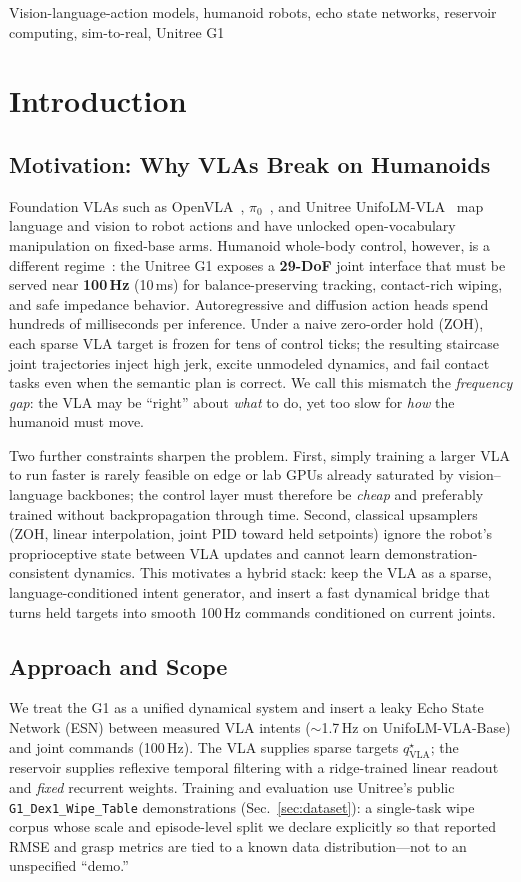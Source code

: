 \documentclass[conference]{IEEEtran}
\begin{document}
\begin{IEEEkeywords}
Vision-language-action models, humanoid robots, echo state networks, reservoir computing, sim-to-real, Unitree G1
\end{IEEEkeywords}

\section{Introduction}
\subsection{Motivation: Why VLAs Break on Humanoids}
Foundation VLAs such as OpenVLA~\cite{OpenVLA2025}, $\pi_0$~\cite{Preprints2026}, and Unitree UnifoLM-VLA~\cite{UnifoLM2026} map language and vision to robot actions and have unlocked open-vocabulary manipulation on fixed-base arms.
Humanoid whole-body control, however, is a different regime~\cite{PhysicalAI2026}: the Unitree G1 exposes a \textbf{29-DoF} joint interface that must be served near \textbf{100\,Hz} (10\,ms) for balance-preserving tracking, contact-rich wiping, and safe impedance behavior.
Autoregressive and diffusion action heads spend hundreds of milliseconds per inference.
Under a naive zero-order hold (ZOH), each sparse VLA target is frozen for tens of control ticks; the resulting staircase joint trajectories inject high jerk, excite unmodeled dynamics, and fail contact tasks even when the semantic plan is correct.
We call this mismatch the \emph{frequency gap}: the VLA may be ``right'' about \emph{what} to do, yet too slow for \emph{how} the humanoid must move.

Two further constraints sharpen the problem.
First, simply training a larger VLA to run faster is rarely feasible on edge or lab GPUs already saturated by vision--language backbones; the control layer must therefore be \emph{cheap} and preferably trained without backpropagation through time.
Second, classical upsamplers (ZOH, linear interpolation, joint PID toward held setpoints) ignore the robot's proprioceptive state between VLA updates and cannot learn demonstration-consistent dynamics.
This motivates a hybrid stack: keep the VLA as a sparse, language-conditioned intent generator, and insert a fast dynamical bridge that turns held targets into smooth 100\,Hz commands conditioned on current joints.

\subsection{Approach and Scope}
We treat the G1 as a unified dynamical system and insert a leaky Echo State Network (ESN) between measured VLA intents ($\sim$1.7\,Hz on UnifoLM-VLA-Base) and joint commands (100\,Hz).
The VLA supplies sparse targets $q^{\star}_{\mathrm{VLA}}$; the reservoir supplies reflexive temporal filtering with a ridge-trained linear readout and \emph{fixed} recurrent weights.
Training and evaluation use Unitree's public \texttt{G1\_Dex1\_Wipe\_Table} demonstrations (Sec.~\ref{sec:dataset}): a single-task wipe corpus whose scale and episode-level split we declare explicitly so that reported RMSE and grasp metrics are tied to a known data distribution---not to an unspecified ``demo.''
\end{document}
